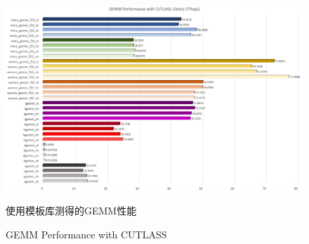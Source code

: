 \begin{figure}
	\centering
	\includegraphics[width=15cm]{figures/CUTLASSGEMM.jpg}
	\renewcommand{\thefigure}{\arabic{section}-\arabic{figure} }
	\renewcommand{\figurename}{图}
	\caption{使用模板库测得的GEMM性能}
	\addtocounter{figure}{-1}
	\renewcommand{\thefigure}{\arabic{section}-\arabic{figure} }
	\renewcommand{\figurename}{Figure}
	\caption{GEMM Performance with CUTLASS}
	\label{Fig-GEMM-CUTLASS}
\end{figure}
